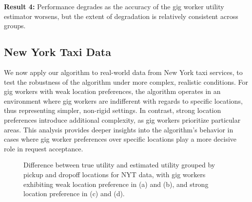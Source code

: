 \noindent \textbf{Result 4:} Performance degrades as the accuracy of the gig worker utility estimator worsens, but the extent of degradation is relatively consistent across groups.

\subsection{New York Taxi Data}
\label{sec:res_nyt}
We now apply our algorithm to real-world data from New York taxi services, to test the robustness of the algorithm under more complex, realistic conditions. For gig workers with weak location preferences, the algorithm operates in an environment where gig workers are indifferent with regards to specific locations, thus representing simpler, non-rigid settings. In contrast, strong location preferences introduce additional complexity, as gig workers prioritize particular areas. This analysis provides deeper insights into the algorithm's behavior in cases where gig worker preferences over specific locations play a more decisive role in request acceptance.

\begin{figure}[b!]
    \centering
    \begin{minipage}{0.48\textwidth}
        \centering
        \fontsize{10}{10}\selectfont
        \hspace*{0.1cm}
    \end{minipage}\hfill
    \begin{minipage}{0.48\textwidth}
        \centering
        \fontsize{10}{10}\selectfont
        \hspace*{0.1cm}
    \end{minipage}
    \caption{\textnormal{Difference between true utility and estimated utility grouped by pickup and dropoff locations for NYT data, with gig workers exhibiting weak location preference in (a) and (b), and strong location preference in (c) and (d).}}
    \label{fig:nyt_combined_mnl}
\end{figure}

